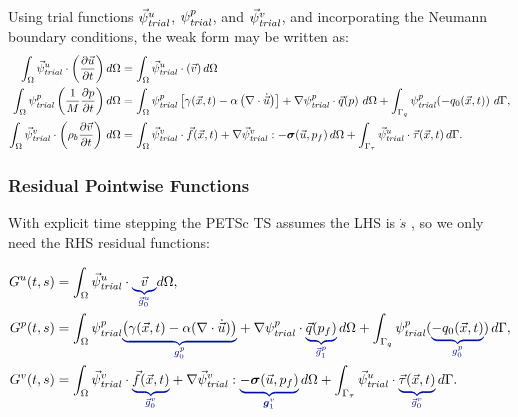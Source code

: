 Using trial functions $\trialvec[u]$, $\trialscalar[p]$, and $\trialvec[v]$, and incorporating the
Neumann boundary conditions, the weak form may be written as:
\begin{align}
    \int_{\Omega} \trialvec[u] \cdot \left( \frac{\partial \vec{u}}{\partial t} \right)d \Omega &= \int_{\Omega} \trialvec[u] \cdot \left( \vec{v} \right) d \Omega \\
    \int_{\Omega} \trialscalar[p] \left( \frac{1}{M}\frac{\partial p}{\partial t} \right) d\Omega &=
    \int_{\Omega} \trialscalar[p] \left[\gamma(\vec{x},t) - \alpha \left(\nabla \cdot \dot{\vec{u}}\right) \right]  + \nabla \trialscalar[p] \cdot \vec{q}(p) \ d\Omega +
    \int_{\Gamma_q} \trialscalar[p] (-q_0(\vec{x},t)) \ d\Gamma, \\
   \int_\Omega \trialvec[v] \cdot \left( \rho_{b} \frac{\partial
   \vec{v}}{\partial t} \right) \,
   d\Omega &= \int_\Omega \trialvec[v] \cdot \vec{f}(\vec{x},t) + \nabla \trialvec[v] :
   -\tensor{\sigma} (\vec{u},p_f) \, d\Omega + \int_{\Gamma_\tau} \trialvec[u]
   \cdot \vec{\tau}(\vec{x},t) \, d\Gamma.
\end{align}



\subsubsection{Residual Pointwise Functions}

With explicit time stepping the PETSc TS assumes the LHS is $\dot{s}$ , so we only need the RHS residual functions:

\begin{align}
  G^u(t,s) &= \int_{\Omega} \trialvec[u] \cdot \eqnannotate{\vec{v}}{\vec{g}_0^u} d \Omega, \\
  G^p(t,s) &= \int_\Omega \trialscalar[p] \eqnannotate{\left(\gamma(\vec{x},t) - \alpha (\nabla \cdot \dot{\vec{u}})\right)}{g^p_0} + \nabla \trialscalar[p] \cdot \eqnannotate{\vec{q}(p_f)}{\vec{g}^p_1} \, d\Omega
 + \int_{\Gamma_q} \trialscalar[p] (\eqnannotate{-q_0(\vec{x},t)}{g^p_0}) \, d\Gamma, \\
 G^v(t,s) &= \int_\Omega \trialvec[v] \cdot \eqnannotate{\vec{f}(\vec{x},t)}{\vec{g}^v_0} + \nabla \trialvec[v] :\eqnannotate{-\tensor{\sigma}(\vec{u},p_f)}{\tensor{g}^v_1} \, d\Omega + \int_{\Gamma_\tau} \trialvec[u] \cdot \eqnannotate{\vec{\tau}(\vec{x},t)}{\vec{g}^v_0} \, d\Gamma.
\end{align}


